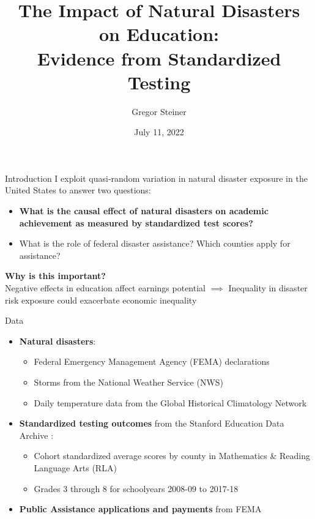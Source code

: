 \documentclass[hyperref={colorlinks = true,linkcolor = blue, citecolor=blue,urlcolor=blue}]{beamer}
\title{The Impact of Natural Disasters on Education: \\ Evidence from Standardized Testing}
\author{Gregor Steiner}
\date{July 11, 2022}
\begin{document}
		
\begin{frame}[plain]
    \maketitle
\end{frame}

\begin{frame}{Introduction}
	I exploit quasi-random variation in natural disaster exposure in the United States to answer two questions:
	\begin{itemize}
		\item \textbf{What is the causal effect of natural disasters on academic achievement as measured by standardized test scores?}
		\item What is the role of federal disaster assistance? Which counties apply for assistance?
	\end{itemize}
	\textbf{Why is this important?}\\
	Negative effects in education affect earnings
	potential $\implies$ Inequality in disaster risk exposure could exacerbate economic inequality
\end{frame}

\begin{frame}{Data}
	\begin{itemize}
		\item \textbf{Natural disasters}:
		\begin{itemize}
			\item Federal Emergency Management Agency (FEMA) declarations 
			\item Storms from the National Weather Service (NWS)
			\item Daily temperature data from the Global Historical Climatology Network
		\end{itemize}
		\item \textbf{Standardized testing outcomes} from the Stanford Education Data Archive \citep{SEDA}:
		\begin{itemize}
			\item Cohort standardized average scores by county in Mathematics \& Reading Language Arts (RLA)
			\item Grades 3 through 8 for schoolyears 2008-09 to 2017-18
		\end{itemize}
		\item \textbf{Public Assistance applications and payments} from FEMA
	\end{itemize}
\end{frame}
\end{document}
